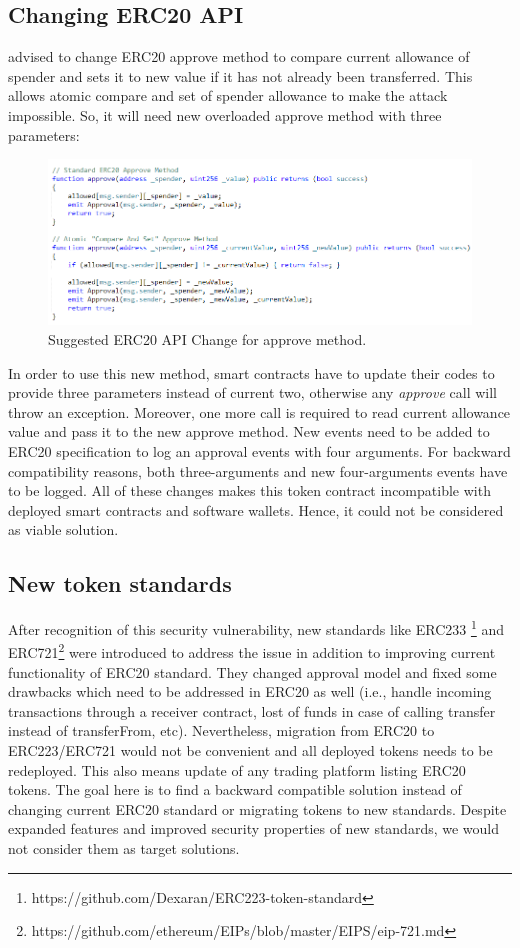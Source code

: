 \subsection{Changing ERC20 API}
\cite{Ref03} advised to change ERC20 approve method to compare current allowance of spender and sets it to new value if it has not already been transferred. This allows atomic compare and set of spender allowance to make the attack impossible. So, it will need new overloaded approve method with three parameters:
\begin{figure}[H]
	\centering
	\includegraphics[width=1.0\linewidth]{figures/multiple_withdrawal_12.png}
	\caption{Suggested ERC20 API Change for approve method.}
\end{figure}
In order to use this new method, smart contracts have to update their codes to provide three parameters instead of current two, otherwise any \textit{approve} call will throw an exception. Moreover, one more call is required to read current allowance value and pass it to the new approve method. New events need to be added to ERC20 specification to log an approval events with four arguments. For backward compatibility reasons, both three-arguments and new four-arguments events have to be logged. All of these changes makes this token contract incompatible with deployed smart contracts and software wallets. Hence, it could not be considered as viable solution.

\subsection{New token standards}
After recognition of this security vulnerability, new standards like ERC233 \footnote{https://github.com/Dexaran/ERC223-token-standard} and ERC721\footnote{https://github.com/ethereum/EIPs/blob/master/EIPS/eip-721.md} were introduced to address the issue in addition to improving current functionality of ERC20 standard. They changed approval model and fixed some drawbacks which need to be addressed in ERC20 as well (i.e., handle incoming transactions through a receiver contract, lost of funds in case of calling transfer instead of transferFrom, etc). Nevertheless, migration from ERC20 to ERC223/ERC721 would not be convenient and all deployed tokens needs to be redeployed. This also means update of any trading platform listing ERC20 tokens. The goal here is to find a backward compatible solution instead of changing current ERC20 standard or migrating tokens to new standards. Despite expanded features and improved security properties of new standards, we would not consider them as target solutions.